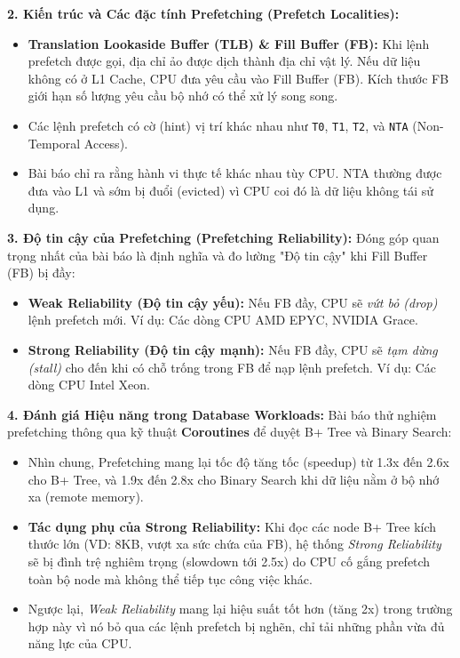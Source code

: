 \documentclass[12pt,a4paper]{article}
\begin{document}
\textbf{2. Kiến trúc và Các đặc tính Prefetching (Prefetch Localities):}
\begin{itemize}
    \item \textbf{Translation Lookaside Buffer (TLB) \& Fill Buffer (FB):} Khi lệnh prefetch được gọi, địa chỉ ảo được dịch thành địa chỉ vật lý. Nếu dữ liệu không có ở L1 Cache, CPU đưa yêu cầu vào Fill Buffer (FB). Kích thước FB giới hạn số lượng yêu cầu bộ nhớ có thể xử lý song song.
    \item Các lệnh prefetch có cờ (hint) vị trí khác nhau như \texttt{T0}, \texttt{T1}, \texttt{T2}, và \texttt{NTA} (Non-Temporal Access). 
    \item Bài báo chỉ ra rằng hành vi thực tế khác nhau tùy CPU. NTA thường được đưa vào L1 và sớm bị đuổi (evicted) vì CPU coi đó là dữ liệu không tái sử dụng.
\end{itemize}

\textbf{3. Độ tin cậy của Prefetching (Prefetching Reliability):}
Đóng góp quan trọng nhất của bài báo là định nghĩa và đo lường "Độ tin cậy" khi Fill Buffer (FB) bị đầy:
\begin{itemize}
    \item \textbf{Weak Reliability (Độ tin cậy yếu):} Nếu FB đầy, CPU sẽ \textit{vứt bỏ (drop)} lệnh prefetch mới. Ví dụ: Các dòng CPU AMD EPYC, NVIDIA Grace.
    \item \textbf{Strong Reliability (Độ tin cậy mạnh):} Nếu FB đầy, CPU sẽ \textit{tạm dừng (stall)} cho đến khi có chỗ trống trong FB để nạp lệnh prefetch. Ví dụ: Các dòng CPU Intel Xeon.
\end{itemize}

\textbf{4. Đánh giá Hiệu năng trong Database Workloads:}
Bài báo thử nghiệm prefetching thông qua kỹ thuật \textbf{Coroutines} để duyệt B+ Tree và Binary Search:
\begin{itemize}
    \item Nhìn chung, Prefetching mang lại tốc độ tăng tốc (speedup) từ 1.3x đến 2.6x cho B+ Tree, và 1.9x đến 2.8x cho Binary Search khi dữ liệu nằm ở bộ nhớ xa (remote memory).
    \item \textbf{Tác dụng phụ của Strong Reliability:} Khi đọc các node B+ Tree kích thước lớn (VD: 8KB, vượt xa sức chứa của FB), hệ thống \textit{Strong Reliability} sẽ bị đình trệ nghiêm trọng (slowdown tới 2.5x) do CPU cố gắng prefetch toàn bộ node mà không thể tiếp tục công việc khác.
    \item Ngược lại, \textit{Weak Reliability} mang lại hiệu suất tốt hơn (tăng 2x) trong trường hợp này vì nó bỏ qua các lệnh prefetch bị nghẽn, chỉ tải những phần vừa đủ năng lực của CPU.
\end{itemize}
\end{document}
